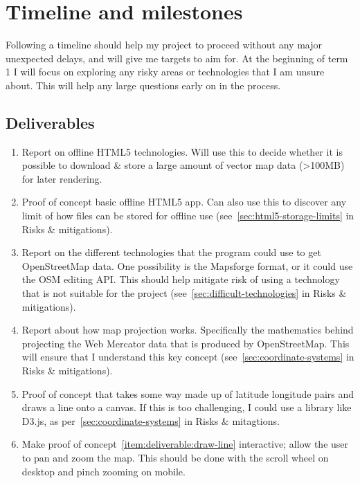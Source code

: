 \documentclass[]{final_report}
\begin{document}
\chapter{Timeline and milestones}

Following a timeline should help my project to proceed without any major unexpected delays, and will give me targets to aim for. At the beginning of term 1 I will focus on exploring any risky areas or technologies that I am unsure about. This will help any large questions early on in the process.

\section{Deliverables}

\begin{enumerate}
    \item Report on offline HTML5 technologies. Will use this to decide whether it is possible to download \& store a large amount of vector map data (>100MB) for later rendering.\label{item:deliverable:offline-html}
    \item Proof of concept basic offline HTML5 app. Can also use this to discover any limit of how files can be stored for offline use (see~\ref{sec:html5-storage-limits} in Risks \& mitigations).\label{item:deliverable:basic-offline-app}
    \item Report on the different technologies that the program could use to get OpenStreetMap data. One possibility is the Mapsforge format, or it could use the OSM editing API\@. This should help mitigate risk of using a technology that is not suitable for the project (see~\ref{sec:difficult-technologies} in Risks \& mitigations).\label{item:deliverable:osm-data}
    \item Report about how map projection works. Specifically the mathematics behind projecting the Web Mercator data that is produced by OpenStreetMap. This will ensure that I understand this key concept (see~\ref{sec:coordinate-systems} in Risks \& mitigations).\label{item:deliverable:map-projection}
    \item Proof of concept that takes some way made up of latitude longitude pairs and draws a line onto a canvas. If this is too challenging, I could use a library like D3.js, as per~\ref{sec:coordinate-systems} in Risks \& mitagtions.\label{item:deliverable:draw-line}
    \item Make proof of concept~\ref{item:deliverable:draw-line} interactive; allow the user to pan and zoom the map. This should be done with the scroll wheel on desktop and pinch zooming on mobile.\label{item:deliverable:pan-zoom}

\end{enumerate}
\end{document}
